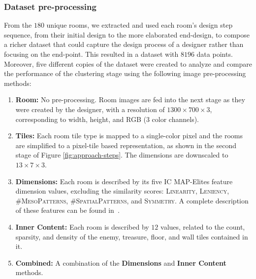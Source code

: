 \subsubsection{Dataset pre-processing}

From the $180$ unique rooms, we extracted and used each room's design step sequence, from their initial design to the more elaborated end-design, to compose a richer dataset that could capture the design process of a designer rather than focusing on the end-point. This resulted in a dataset with $8196$ data points. 
Moreover, five different copies of the dataset were created to analyze and compare the performance of the clustering stage using the following image pre-processing methods:
\begin{enumerate}
    \item \textbf{Room:} No pre-processing. Room images are fed into the next stage as they were created by the designer, with a resolution of $1300\times 700\times3$, corresponding to width, height, and RGB ($3$ color channels).
    
    \item \textbf{Tiles:} Each room tile type is mapped to a single-color pixel and the rooms are simplified to a pixel-tile based representation, as shown in the second stage of Figure \ref{fig:approach-steps}. The dimensions are downscaled to $13\times 7\times3$.
    
    \item \textbf{Dimensions:} Each room is described by its five IC MAP-Elites feature dimension values, excluding the similarity scores: \textsc{Linearity}, \textsc{Leniency}, \textsc{\#MesoPatterns}, \textsc{\#SpatialPatterns}, and \textsc{Symmetry}. A complete description of these features can be found in~\cite{p10Alvarez2020-ICMAPE}.
    
    \item \textbf{Inner Content:} Each room is described by $12$ values, related to the count, sparsity, and density of the enemy, treasure, floor, and wall tiles contained in it.
    
    \item \textbf{Combined:} A combination of the \textbf{Dimensions} and \textbf{Inner Content} methods.
\end{enumerate}

